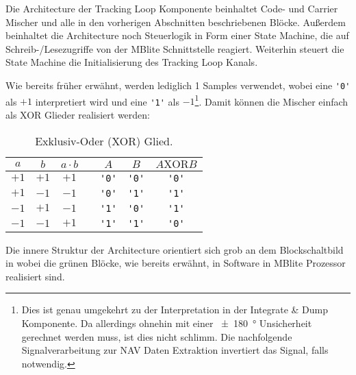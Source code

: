 Die Architecture der Tracking Loop Komponente beinhaltet Code- und Carrier Mischer und alle in den vorherigen Abschnitten beschriebenen Blöcke. Außerdem beinhaltet die Architecture noch Steuerlogik in Form einer State Machine, die auf Schreib-/Lesezugriffe von der MBlite Schnittstelle reagiert. Weiterhin steuert die State Machine die Initialisierung des Tracking Loop Kanals.

Wie bereits früher erwähnt, werden lediglich \SI{1}{\bit} Samples verwendet, wobei eine \lstinline$'0'$ als $+1$ interpretiert wird und eine \lstinline$'1'$ als $-1$\footnote{Dies ist genau umgekehrt zu der Interpretation in der Integrate \& Dump Komponente. Da allerdings ohnehin mit einer \SI{\pm180}{\degree} Unsicherheit gerechnet werden muss, ist dies nicht schlimm. Die nachfolgende Signalverarbeitung zur NAV Daten Extraktion invertiert das Signal, falls notwendig.}. Damit können die Mischer einfach als XOR Glieder realisiert werden:

\begin{table}[htbp]
    \ttabbox
    {
        \caption[Exklusiv-Oder Glied]{Exklusiv-Oder (XOR) Glied.}
        \label{TabXOR}
    }
    {
    \begin{tabular}{c c c c c c c}
        \toprule
        $a$ 	& $b$ 	& $a\cdot b$ 	& & $A$	& $B$		& $A \textrm{XOR} B$ \\
        \midrule
        $+1$	& $+1$ 	& $+1$ 		& & \lstinline$'0'$	& \lstinline$'0'$ & \lstinline$'0'$\\
        $+1$	& $-1$ 	& $-1$ 		& & \lstinline$'0'$	& \lstinline$'1'$ & \lstinline$'1'$\\
        $-1$	& $+1$ 	& $-1$ 		& & \lstinline$'1'$	& \lstinline$'0'$ & \lstinline$'1'$\\
        $-1$	& $-1$ 	& $+1$ 		& & \lstinline$'1'$	& \lstinline$'1'$ & \lstinline$'0'$\\
        \bottomrule
    \end{tabular}
}
\end{table}

Die innere Struktur der Architecture orientiert sich grob an dem Blockschaltbild in  wobei die grünen Blöcke, wie bereits erwähnt, in Software in MBlite Prozessor realisiert sind.
